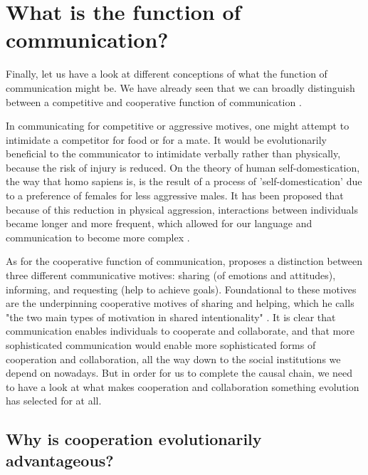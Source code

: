 \section{What is the function of communication?}
\label{sec:comm:function}

Finally, let us have a look at different conceptions of what the function of communication might be. We have already seen that we can broadly distinguish between a competitive and cooperative function of communication \citep{SeyfarthCheney03}.

In communicating for competitive or aggressive motives, one might attempt to intimidate a competitor for food or for a mate. It would be evolutionarily beneficial to the communicator to intimidate verbally rather than physically, because the risk of injury is reduced.
On the theory of human self-domestication, the way that homo sapiens is, is the result of a process of 'self-domestication' due to a preference of females for less aggressive males. It has been proposed that because of this reduction in physical aggression, interactions between individuals became longer and more frequent, which allowed for our language and communication to become more complex \citep{Benitez21}.

As for the cooperative function of communication, \citet{Tomasello08-origins} proposes a distinction between three different communicative motives: sharing (of emotions and attitudes), informing, and requesting (help to achieve goals). Foundational to these motives are the underpinning cooperative motives of sharing and helping, which he calls "the two main types of motivation in shared intentionality" \citep[p.~123]{Tomasello08-origins}.
It is clear that communication enables individuals to cooperate and collaborate, and that more sophisticated communication would enable more sophisticated forms of cooperation and collaboration, all the way down to the social institutions we depend on nowadays.
But in order for us to complete the causal chain, we need to have a look at what makes cooperation and collaboration something evolution has selected for at all.

\subsection{Why is cooperation evolutionarily advantageous?}

